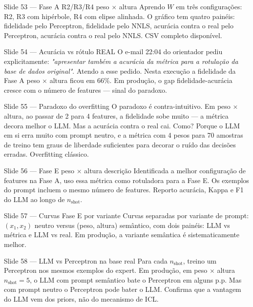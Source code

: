 \documentclass[aspectratio=169,10pt]{beamer}
\begin{document}
\begin{frame}{Slide 53 --- Fase A R2/R3/R4 peso $\times$ altura}
\footnotesize
Aprendo $W$ em tr\^es configura\c{c}\~oes: R2, R3 com hip\'erbole, R4 com elipse alinhada. O gr\'afico tem quatro pain\'eis: fidelidade pelo Perceptron, fidelidade pelo NNLS, acur\'acia contra o real pelo Perceptron, acur\'acia contra o real pelo NNLS. CSV completo dispon\'ivel.
\end{frame}

\begin{frame}{Slide 54 --- Acur\'acia vs r\'otulo REAL}
\footnotesize
O e-mail 22:04 do orientador pediu explicitamente: \emph{"apresentar tamb\'em a acur\'acia da m\'etrica para a rotula\c{c}\~ao da base de dados original"}. Atendo a esse pedido. Nesta execu\c{c}\~ao a fidelidade da Fase A peso $\times$ altura ficou em 66\%. Em produ\c{c}\~ao, o gap fidelidade-acur\'acia cresce com o n\'umero de features --- sinal do paradoxo.
\end{frame}

\begin{frame}{Slide 55 --- Paradoxo do overfitting}
\footnotesize
O paradoxo \'e contra-intuitivo. Em peso $\times$ altura, ao passar de 2 para 4 features, a fidelidade sobe muito --- a m\'etrica decora melhor o LLM. Mas a acur\'acia contra o real cai. Como? Porque o LLM em si erra muito com prompt neutro, e a m\'etrica com 4 pesos para 70 amostras de treino tem graus de liberdade suficientes para decorar o ru\'ido das decis\~oes erradas. Overfitting cl\'assico.
\end{frame}

\begin{frame}{Slide 56 --- Fase E peso $\times$ altura descri\c{c}\~ao}
\footnotesize
Identificada a melhor configura\c{c}\~ao de features na Fase A, uso essa m\'etrica como rotuladora para a Fase E. Os exemplos do prompt incluem o mesmo n\'umero de features. Reporto acur\'acia, Kappa e F1 do LLM ao longo de $n_{\text{shot}}$.
\end{frame}

\begin{frame}{Slide 57 --- Curvas Fase E por variante}
\footnotesize
Curvas separadas por variante de prompt: $(x_1, x_2)$ neutro versus (peso, altura) sem\^antico, com dois pain\'eis: LLM vs m\'etrica e LLM vs real. Em produ\c{c}\~ao, a variante sem\^antica \'e sistematicamente melhor.
\end{frame}

\begin{frame}{Slide 58 --- LLM vs Perceptron na base real}
\footnotesize
Para cada $n_{\text{shot}}$, treino um Perceptron nos mesmos exemplos do expert. Em produ\c{c}\~ao, em peso $\times$ altura $n_{\text{shot}}=5$, o LLM com prompt sem\^antico bate o Perceptron em alguns p.p. Mas com prompt neutro o Perceptron pode bater o LLM. Confirma que a vantagem do LLM vem dos priors, n\~ao do mecanismo de ICL.
\end{frame}
\end{document}
